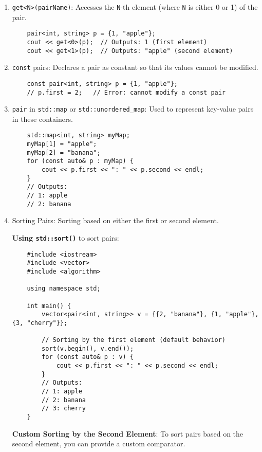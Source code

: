 \documentclass{article}
\begin{document}
\begin{enumerate}
    \item \texttt{get<N>(pairName)}: Accesses the \texttt{N}-th element (where \texttt{N} is either 0 or 1) of the pair.
    \begin{lstlisting}
    pair<int, string> p = {1, "apple"};
    cout << get<0>(p);  // Outputs: 1 (first element)
    cout << get<1>(p);  // Outputs: "apple" (second element)
    \end{lstlisting}

    \item \texttt{const} pairs: Declares a pair as constant so that its values cannot be modified.
    \begin{lstlisting}
    const pair<int, string> p = {1, "apple"};
    // p.first = 2;   // Error: cannot modify a const pair
    \end{lstlisting}
    
    \item \texttt{pair} in \texttt{std::map} or \texttt{std::unordered\_map}: Used to represent key-value pairs in these containers.
    \begin{lstlisting}
    std::map<int, string> myMap;
    myMap[1] = "apple";
    myMap[2] = "banana";
    for (const auto& p : myMap) {
        cout << p.first << ": " << p.second << endl;
    }
    // Outputs:
    // 1: apple
    // 2: banana
    \end{lstlisting}

    \item Sorting Pairs: Sorting based on either the first or second element.
    
    \textbf{Using \texttt{std::sort()}} to sort pairs:
    \begin{lstlisting}
    #include <iostream>
    #include <vector>
    #include <algorithm>

    using namespace std;

    int main() {
        vector<pair<int, string>> v = {{2, "banana"}, {1, "apple"}, {3, "cherry"}};

        // Sorting by the first element (default behavior)
        sort(v.begin(), v.end());
        for (const auto& p : v) {
            cout << p.first << ": " << p.second << endl;
        }
        // Outputs: 
        // 1: apple
        // 2: banana
        // 3: cherry
    }
    \end{lstlisting}

    \textbf{Custom Sorting by the Second Element}:
    To sort pairs based on the second element, you can provide a custom comparator.


\end{enumerate}
\end{document}
